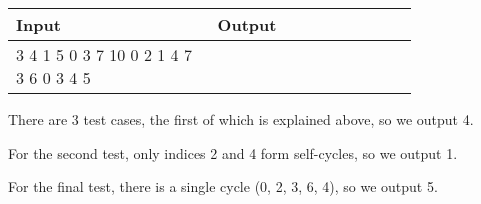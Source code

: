 \begin{table}[h]
    \centering
    \begin{tabular}{|p{0.4\linewidth}|p{0.4\linewidth}|}
        \hline
        Input & Output \\
        \hline
        3 \newline 2 4 1 5 0 3 7 10 \newline 5 0 2 1 4 \newline 2 7 3 6 0 3 4 5 & 
        \text{} \newline 4 \newline 1 \newline 5 \\
        \hline
    \end{tabular}
\end{table}

There are 3 test cases, the first of which is explained above, so we output 4.

For the second test, only indices 2 and 4 form self-cycles, so we output 1.

For the final test, there is a single cycle (0, 2, 3, 6, 4), so we output 5.